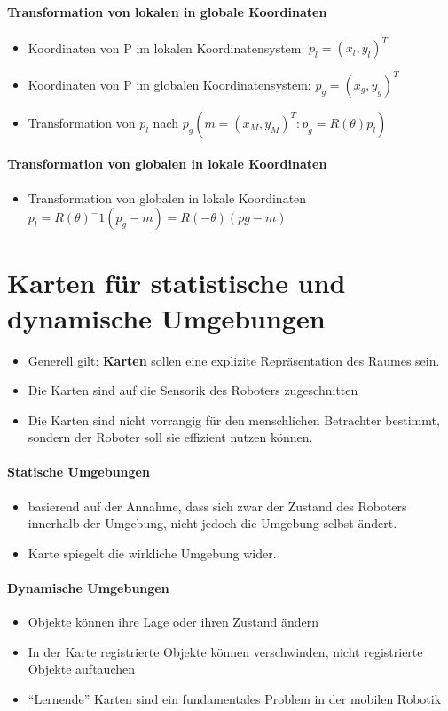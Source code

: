 \paragraph{Transformation von lokalen in globale Koordinaten}
\begin{itemize}
	\item Koordinaten von P im lokalen Koordinatensystem: $p_l=(x_l, y_l)^T$
	\item Koordinaten von P im globalen Koordinatensystem: $p_g = (x_g, y_g)^T$
	\item Transformation von $p_l$ nach $p_g(m=(x_M, y_M)^T: p_g=R(\theta)p_l)$
\end{itemize}
\paragraph{Transformation von globalen in lokale Koordinaten}
\begin{itemize}
	\item Transformation von globalen in lokale Koordinaten $p_l = R(\theta)^-1(p_g - m) = R(-\theta)(pg - m)$
\end{itemize}
\section{Karten für statistische und dynamische Umgebungen}
\begin{itemize}
	\item Generell gilt: \textbf{Karten} sollen eine explizite Repräsentation des Raumes sein.
	\item Die Karten sind auf die Sensorik des Roboters zugeschnitten
	\item Die Karten sind nicht vorrangig für den menschlichen Betrachter bestimmt, sondern der Roboter soll sie effizient nutzen können.
\end{itemize}
\paragraph{Statische Umgebungen}
\begin{itemize}
	\item basierend auf der Annahme, dass sich zwar der Zustand des Roboters innerhalb der Umgebung, nicht jedoch die Umgebung selbst ändert.
	\item Karte spiegelt die wirkliche Umgebung wider.
\end{itemize}
\paragraph{Dynamische Umgebungen}
\begin{itemize}
	\item Objekte können ihre Lage oder ihren Zustand ändern
	\item In der Karte registrierte Objekte können verschwinden, nicht registrierte Objekte auftauchen
	\item \enquote{Lernende} Karten sind ein fundamentales Problem in der mobilen Robotik
\end{itemize}
